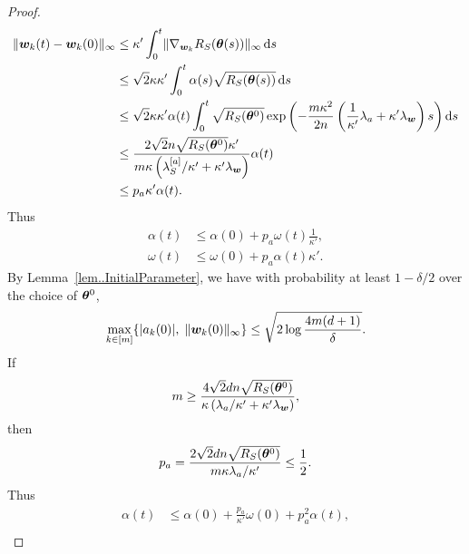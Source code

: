 \documentclass[twoside,11pt]{article}
\begin{document}
\begin{proof}
\begin{equation*}
        \begin{aligned}
            \lVert\bm{w}_k(t) - \bm{w}_k(0)\rVert_{\infty}
             & \leq \kappa'\int_{0}^{t} \lVert\nabla_{\bm{w}_k}R_S(\bm{\theta}(s))\rVert_{\infty}\mathop{}\!\mathrm{d}{s}                                                                                                     \\
             & \leq \sqrt{2}\kappa\kappa' \int_{0}^t \alpha(s)\sqrt{R_S(\bm{\theta}(s))} \mathop{}\!\mathrm{d}{s}                                                                                                     \\
             & \leq \sqrt{2}\kappa\kappa' \alpha(t) \int_{0}^{t} \sqrt{R_S(\bm{\theta}^0)}\exp\left(-\frac{m\kappa^2}{2n}\left(\frac{1}{\kappa'}\lambda_a+\kappa'\lambda_{\bm{w}}\right)s\right)\mathop{}\!\mathrm{d}{s} \\
             & \leq \frac{2\sqrt{2}n\sqrt{R_S(\bm{\theta}^0)}\kappa'}{m\kappa\left(\lambda^{[a]}_S/\kappa'+\kappa'\lambda_{\bm{w}}\right)}\alpha(t)                                                      \\
             & \leq p_a\kappa'\alpha(t).
        \end{aligned}
    \end{equation*}
    Thus
    \begin{equation*}
        \begin{aligned}
            \alpha(t) & \leq\alpha(0)+p_a\omega(t)\frac{1}{\kappa'}, \\
            \omega(t) & \leq\omega(0)+p_a\alpha(t)\kappa'.
        \end{aligned}
    \end{equation*}
    By Lemma~\ref{lem..InitialParameter}, we have with probability at least $1 - \delta/2$ over the choice of $\bm{\theta}^0$,
    \begin{equation*}
        \max\limits_{k\in[m]}\{\lvert a_k(0)\rvert,\;\lVert\bm{w}_k(0)\rVert_{\infty}\}\leq\sqrt{2\log\frac{4m(d+1)}{\delta}}.
    \end{equation*}
    If
    \begin{equation*}
        m \geq \frac{4\sqrt{2}dn\sqrt{R_S(\bm{\theta}^0)}}{\kappa\left(\lambda_a/\kappa'+\kappa'\lambda_{\bm{w}}\right)},
    \end{equation*}
    then
    \begin{equation*}
        p_a=\frac{2\sqrt{2}dn\sqrt{R_S(\bm{\theta}^0)}}{m\kappa\lambda_a/\kappa'}\leq \frac{1}{2}.
    \end{equation*}
    Thus
    \begin{align*}
        \alpha(t) & \leq\alpha(0)+\frac{p_a}{\kappa'}\omega(0)+p_a^2\alpha(t),      \\

\end{align*}
\end{proof}
\end{document}
